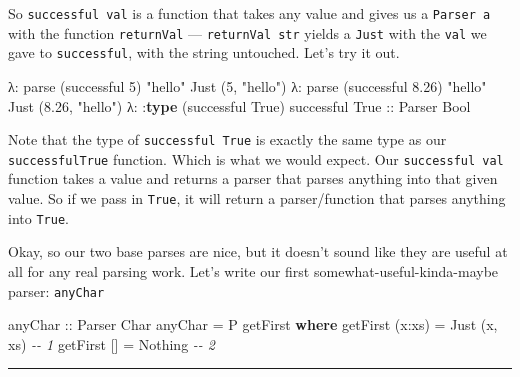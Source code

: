 \documentclass[]{article}
\newenvironment{Shaded}{}{}
\newcommand{\CommentTok}[1]{\textcolor[rgb]{0.38,0.63,0.69}{\textit{#1}}}
\newcommand{\DataTypeTok}[1]{\textcolor[rgb]{0.56,0.13,0.00}{#1}}
\newcommand{\DecValTok}[1]{\textcolor[rgb]{0.25,0.63,0.44}{#1}}
\newcommand{\FloatTok}[1]{\textcolor[rgb]{0.25,0.63,0.44}{#1}}
\newcommand{\KeywordTok}[1]{\textcolor[rgb]{0.00,0.44,0.13}{\textbf{#1}}}
\newcommand{\NormalTok}[1]{#1}
\newcommand{\OperatorTok}[1]{\textcolor[rgb]{0.40,0.40,0.40}{#1}}
\newcommand{\OtherTok}[1]{\textcolor[rgb]{0.00,0.44,0.13}{#1}}
\newcommand{\StringTok}[1]{\textcolor[rgb]{0.25,0.44,0.63}{#1}}
\begin{document}
So \texttt{successful\ val} is a function that takes any value and gives us a
\texttt{Parser\ a} with the function \texttt{returnVal} ---
\texttt{returnVal\ str} yields a \texttt{Just} with the \texttt{val} we gave to
\texttt{successful}, with the string untouched. Let's try it out.

\begin{Shaded}
\begin{Highlighting}[]
\NormalTok{λ}\OperatorTok{:}\NormalTok{ parse (successful }\DecValTok{5}\NormalTok{) }\StringTok{"hello"}
\DataTypeTok{Just}\NormalTok{ (}\DecValTok{5}\NormalTok{, }\StringTok{"hello"}\NormalTok{)}
\NormalTok{λ}\OperatorTok{:}\NormalTok{ parse (successful }\FloatTok{8.26}\NormalTok{) }\StringTok{"hello"}
\DataTypeTok{Just}\NormalTok{ (}\FloatTok{8.26}\NormalTok{, }\StringTok{"hello"}\NormalTok{)}
\NormalTok{λ}\OperatorTok{:} \OperatorTok{:}\KeywordTok{type}\NormalTok{ (successful }\DataTypeTok{True}\NormalTok{)}
\NormalTok{successful }\DataTypeTok{True}\OtherTok{ ::} \DataTypeTok{Parser} \DataTypeTok{Bool}
\end{Highlighting}
\end{Shaded}

Note that the type of \texttt{successful\ True} is exactly the same type as our
\texttt{successfulTrue} function. Which is what we would expect. Our
\texttt{successful\ val} function takes a value and returns a parser that parses
anything into that given value. So if we pass in \texttt{True}, it will return a
parser/function that parses anything into \texttt{True}.

Okay, so our two base parses are nice, but it doesn't sound like they are useful
at all for any real parsing work. Let's write our first
somewhat-useful-kinda-maybe parser: \texttt{anyChar}

\begin{Shaded}
\begin{Highlighting}[]
\OtherTok{anyChar ::} \DataTypeTok{Parser} \DataTypeTok{Char}
\NormalTok{anyChar }\OtherTok{=} \DataTypeTok{P}\NormalTok{ getFirst}
    \KeywordTok{where}
\NormalTok{        getFirst (x}\OperatorTok{:}\NormalTok{xs) }\OtherTok{=} \DataTypeTok{Just}\NormalTok{ (x, xs)          }\CommentTok{{-}{-} 1}
\NormalTok{        getFirst []     }\OtherTok{=} \DataTypeTok{Nothing}               \CommentTok{{-}{-} 2}
\end{Highlighting}
\end{Shaded}

\begin{center}\rule{0.5\linewidth}{\linethickness}\end{center}
\end{document}
